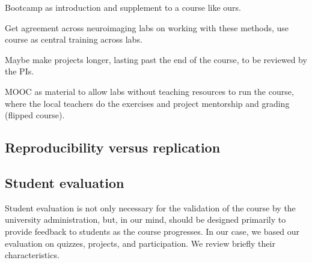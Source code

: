 Bootcamp as introduction and supplement to a course like ours.

Get agreement across neuroimaging labs on working with these methods, use
course as central training across labs.

Maybe make projects longer, lasting past the end of the course, to be reviewed
by the PIs.

MOOC as material to allow labs without teaching resources to run the course,
where the local teachers do the exercises and project mentorship and grading
(flipped course).

\subsection{Reproducibility versus replication}


\subsection{Student evaluation}

Student evaluation is not only necessary for the validation of the course by
the university administration, but, in our mind, should be designed primarily
to provide feedback to students as the course progresses.
In our case, we based our evaluation on quizzes, projects, and participation.
We review briefly their characteristics.

